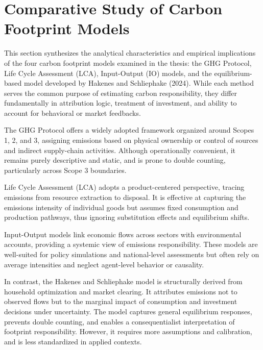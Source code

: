 \documentclass[12pt,a4paper]{article}
\begin{document}
\section{Comparative Study of Carbon Footprint Models}

This section synthesizes the analytical characteristics and empirical implications of the four carbon footprint models examined in the thesis: the GHG Protocol, Life Cycle Assessment (LCA), Input-Output (IO) models, and the equilibrium-based model developed by Hakenes and Schliephake (2024). While each method serves the common purpose of estimating carbon responsibility, they differ fundamentally in attribution logic, treatment of investment, and ability to account for behavioral or market feedbacks.

The GHG Protocol offers a widely adopted framework organized around Scopes 1, 2, and 3, assigning emissions based on physical ownership or control of sources and indirect supply-chain activities. Although operationally convenient, it remains purely descriptive and static, and is prone to double counting, particularly across Scope 3 boundaries.

Life Cycle Assessment (LCA) adopts a product-centered perspective, tracing emissions from resource extraction to disposal. It is effective at capturing the emissions intensity of individual goods but assumes fixed consumption and production pathways, thus ignoring substitution effects and equilibrium shifts.

Input-Output models link economic flows across sectors with environmental accounts, providing a systemic view of emissions responsibility. These models are well-suited for policy simulations and national-level assessments but often rely on average intensities and neglect agent-level behavior or causality.

In contrast, the Hakenes and Schliephake model is structurally derived from household optimization and market clearing. It attributes emissions not to observed flows but to the marginal impact of consumption and investment decisions under uncertainty. The model captures general equilibrium responses, prevents double counting, and enables a consequentialist interpretation of footprint responsibility. However, it requires more assumptions and calibration, and is less standardized in applied contexts.
\end{document}
